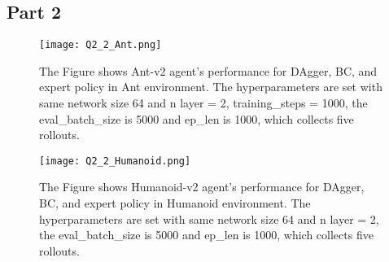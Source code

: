 \documentclass{article}
\begin{document}
\subsection{Part 2}

\begin{figure}[ht]
\centering
\texttt{[image: Q2\_2\_Ant.png]}
\caption{The Figure shows Ant-v2 agent's performance for DAgger, BC, and expert policy in Ant environment. The hyperparameters are set with same network size 64 and n layer = 2, training\_steps = 1000, the eval\_batch\_size is 5000 and ep\_len is 1000, which collects five rollouts.}
\label{fig:image2}
\end{figure}

\begin{figure}[ht]
\centering
\texttt{[image: Q2\_2\_Humanoid.png]}
\caption{The Figure shows Humanoid-v2 agent's performance for DAgger, BC, and expert policy in Humanoid environment. The hyperparameters are set with same network size 64 and n layer = 2, the eval\_batch\_size is 5000 and ep\_len is 1000, which collects five rollouts.}
\label{fig:image3}
\end{figure}
\end{document}
